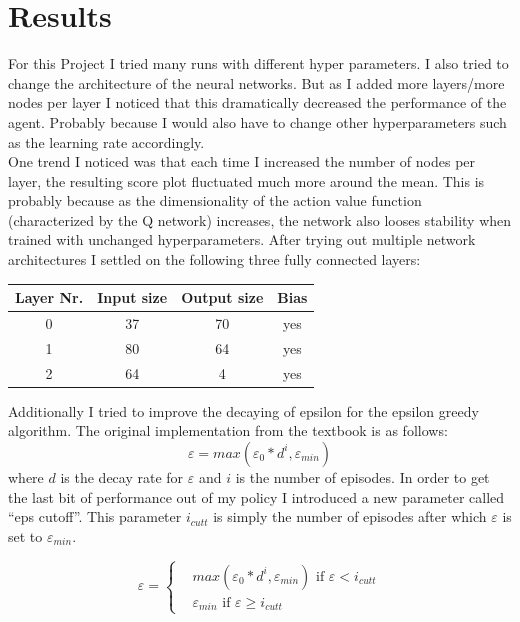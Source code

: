 \documentclass[12pt,a4paper]{article}
\begin{document}
    \section{Results}\label{sec:results}
    For this Project I tried many runs with different hyper parameters.
    I also tried to change the architecture of the neural networks.
    But as I added more layers/more nodes per layer I noticed that this dramatically decreased the performance of the agent.
    Probably because I would also have to change other hyperparameters such as the learning rate accordingly.
    \\
    One trend I noticed was that each time I increased the number of nodes per layer, the resulting score plot fluctuated much more around the mean.
    This is probably because as the dimensionality of the action value function (characterized by the Q network) increases, the network also looses stability when trained with unchanged hyperparameters.
    After trying out multiple network architectures I settled on the following three fully connected layers:
    \\
    \begin{center}
        \begin{tabular}{||c c c c||}
            \hline
            Layer Nr. & Input size & Output size & Bias \\ [0.5ex]
            \hline\hline
            0         & 37         & 70          & yes  \\
            \hline
            1         & 80         & 64          & yes  \\
            \hline
            2         & 64         & 4           & yes \\ [1ex]
            \hline
        \end{tabular}
    \end{center}
    \newpage

    \noindent Additionally I tried to improve the decaying of epsilon for the epsilon greedy algorithm.
    The original implementation from the textbook is as follows:
    $$\varepsilon = max(\varepsilon_{0} * d^{i}, \varepsilon_{min})$$
    where $d$ is the decay rate for $\varepsilon$ and $i$ is the number of episodes.
    In order to get the last bit of performance out of my policy I introduced a new parameter called ``eps cutoff''.
    This parameter $i_{cutt}$ is simply the number of episodes after which $\varepsilon$ is set to $\varepsilon_{min}$.

    $$\varepsilon = \begin{cases}
                        & max(\varepsilon_{0} * d^{i}, \varepsilon_{min}) \text{ if } \varepsilon < i_{cutt} \\
                        & \varepsilon_{min} \text{ if } \varepsilon \geq  i_{cutt}
    \end{cases}$$
\end{document}
